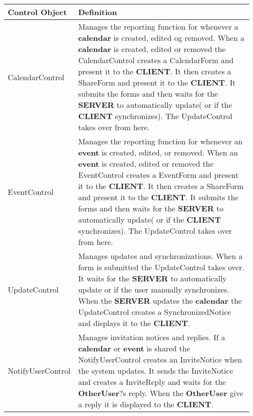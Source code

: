 \newpage

\begin{tabular}{|l|p{10cm}|}
\hline
\textbf{Control Object} & \textbf{Definition} \\ \hline
CalendarControl & 
Manages the reporting function for whenever a \textbf{calendar} is created, edited og removed. 
When a \textbf{calendar} is created, edited or removed the CalendarControl creates a CalendarForm and present it to the \textbf{CLIENT}. It then creates a ShareForm and present it to the \textbf{CLIENT}. It submits the forms and then waits for the \textbf{SERVER} to automatically update( or if the \textbf{CLIENT} synchronizes). The UpdateControl takes over from here. \\ \hline
EventControl & 
Manages the reporting function for whenever an \textbf{event} is created, edited, or removed. 
When an \textbf{event} is created, edited or removed the EventControl creates a EventForm and present it to the \textbf{CLIENT}. It then creates a ShareForm and present it to the \textbf{CLIENT}. It submits the forms and then waits for the \textbf{SERVER} to automatically update( or if the \textbf{CLIENT} synchronizes). The UpdateControl takes over from here. \\ \hline
UpdateControl & 
Manages updates and synchronizations. When a form is submitted the UpdateControl takes over. It waits for the \textbf{SERVER} to automatically update or if the user manually synchronizes. 
When the \textbf{SERVER} updates the \textbf{calendar} the UpdateControl creates a SynchronizedNotice and displays it to the \textbf{CLIENT}. \\ \hline
NotifyUserControl & 
Manages invitation notices and replies. 
If a \textbf{calendar} or \textbf{event} is shared the NotifyUserControl creates an InviteNotice when the system updates. It sends the InviteNotice and creates a InviteReply and waits for the \textbf{OtherUser}?s reply. When the \textbf{OtherUser} give a reply it is displayed to the \textbf{CLIENT}. \\ \hline
\end{tabular}